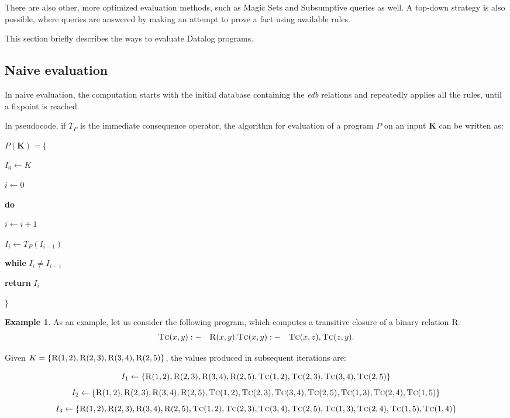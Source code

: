 \documentclass{pracamgr}
\theoremstyle{plain}
\theoremstyle{definition}
\newtheorem{exmp}{Example}[section]
\theoremstyle{remark}
\newcommand{\relat}[2]{$\textsc{#1}#2$}
\begin{document}
There are also other, more optimized evaluation methods, such as Magic Sets and Subsumptive queries as well. A top-down strategy is also possible, where queries are answered by making an attempt to prove a fact using available rules.

This section briefly describes the ways to evaluate Datalog programs.

\subsection{Naive evaluation}
In naive evaluation, the computation starts with the initial database containing the \emph{edb} relations and repeatedly applies all the rules, until a fixpoint is reached.

In pseudocode, if $T_P$ is the immediate consequence operator, the algorithm for evaluation of a program $P$ on an input $\textbf{K}$ can be written as:

\parbox{0.5\textwidth}{
$P(\textbf{K}) = \{$

{\addtolength{\leftskip}{5mm}

$I_0 \leftarrow K$

$i \leftarrow 0$

\textbf{do}

{\addtolength{\leftskip}{5mm}

$i \leftarrow i + 1$

$I_i \leftarrow T_P(I_{i-1})$

}

\textbf{while} $I_i \ne I_{i-1}$

\textbf{return} $I_i$

}

$\}$
}

\begin{exmp}
As an example, let us consider the following program, which computes a transitive closure of a binary relation \relat{R}{}:
\begin{align}
\textsc{Tc}(x, y) &:-& \textsc{R}(x, y).
\textsc{Tc}(x, y) &:-& \textsc{Tc}(x, z), \textsc{Tc}(z, y).
\end{align}

Given $K = \{\textsc{R}(1, 2), \textsc{R}(2, 3), \textsc{R}(3, 4), \textsc{R}(2, 5)\}$, the values produced in subsequent iterations are:

$$I_1 \leftarrow \{\textsc{R}(1, 2), \textsc{R}(2, 3), \textsc{R}(3, 4), \textsc{R}(2, 5), \textsc{Tc}(1, 2), \textsc{Tc}(2, 3), \textsc{Tc}(3, 4), \textsc{Tc}(2, 5)\}$$
$$I_2 \leftarrow \{\textsc{R}(1, 2), \textsc{R}(2, 3), \textsc{R}(3, 4), \textsc{R}(2, 5), \textsc{Tc}(1, 2), \textsc{Tc}(2, 3), \textsc{Tc}(3, 4), \textsc{Tc}(2, 5), \textsc{Tc}(1, 3), \textsc{Tc}(2, 4), \textsc{Tc}(1, 5)\}$$
$$I_3 \leftarrow \{\textsc{R}(1, 2), \textsc{R}(2, 3), \textsc{R}(3, 4), \textsc{R}(2, 5), \textsc{Tc}(1, 2), \textsc{Tc}(2, 3), \textsc{Tc}(3, 4), \textsc{Tc}(2, 5), \textsc{Tc}(1, 3), \textsc{Tc}(2, 4), \textsc{Tc}(1, 5), \textsc{Tc}(1, 4)\}$$
\end{exmp}\label{ex:naiveeval}
\end{document}
